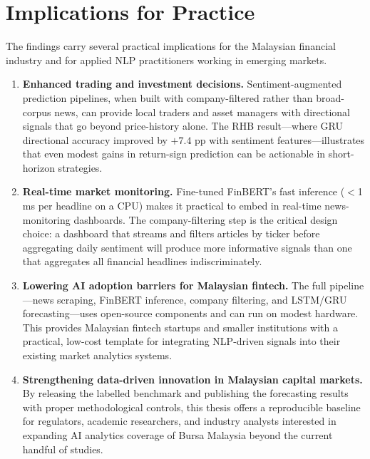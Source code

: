 \documentclass[12pt]{ucetd}
\begin{document}
\section{Implications for Practice}

The findings carry several practical implications for the Malaysian financial industry and for applied NLP practitioners working in emerging markets.

\begin{enumerate}
    \item \textbf{Enhanced trading and investment decisions.} Sentiment-augmented prediction pipelines, when built with company-filtered rather than broad-corpus news, can provide local traders and asset managers with directional signals that go beyond price-history alone. The RHB result---where GRU directional accuracy improved by $+7.4$ pp with sentiment features---illustrates that even modest gains in return-sign prediction can be actionable in short-horizon strategies.

    \item \textbf{Real-time market monitoring.} Fine-tuned FinBERT's fast inference ($<$1 ms per headline on a CPU) makes it practical to embed in real-time news-monitoring dashboards. The company-filtering step is the critical design choice: a dashboard that streams and filters articles by ticker before aggregating daily sentiment will produce more informative signals than one that aggregates all financial headlines indiscriminately.

    \item \textbf{Lowering AI adoption barriers for Malaysian fintech.} The full pipeline---news scraping, FinBERT inference, company filtering, and LSTM/GRU forecasting---uses open-source components and can run on modest hardware. This provides Malaysian fintech startups and smaller institutions with a practical, low-cost template for integrating NLP-driven signals into their existing market analytics systems.

    \item \textbf{Strengthening data-driven innovation in Malaysian capital markets.} By releasing the labelled benchmark and publishing the forecasting results with proper methodological controls, this thesis offers a reproducible baseline for regulators, academic researchers, and industry analysts interested in expanding AI analytics coverage of Bursa Malaysia beyond the current handful of studies.
\end{enumerate}
\end{document}
